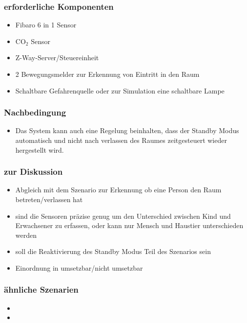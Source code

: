 \subsubsection{erforderliche Komponenten}
\begin{itemize}
	\item Fibaro 6 in 1 Sensor
	\item CO$_2$ Sensor
	\item Z-Way-Server/Steuereinheit
	\item 2 Bewegungsmelder zur Erkennung von Eintritt in den Raum
	\item Schaltbare Gefahrenquelle oder zur Simulation eine schaltbare Lampe
\end{itemize}

\subsubsection{Nachbedingung}
\begin{itemize}
	\item Das System kann auch eine Regelung beinhalten, dass der Standby Modus automatisch und nicht nach verlassen des Raumes zeitgesteuert wieder hergestellt wird.
\end{itemize}

\subsubsection{zur Diskussion}
\begin{itemize}
	\item Abgleich mit dem Szenario zur Erkennung ob eine Person den Raum betreten/verlassen hat
	\item sind die Sensoren präzise genug um den Unterschied zwischen Kind und Erwachsener zu erfassen, oder kann nur Mensch und Haustier unterschieden werden
	\item soll die Reaktivierung des Standby Modus Teil des Szenarios sein
	\item Einordnung in umsetzbar/nicht umsetzbar
\end{itemize}

\subsubsection{ähnliche Szenarien}
\begin{itemize}
	\item {}
	\item {}
\end{itemize}

